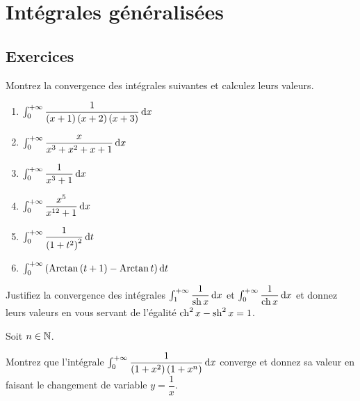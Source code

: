 \chapter{Intégrales généralisées}

\minitoc

\section*{Exercices}

\legendeexercices

\begin{exos}
Montrez la convergence des intégrales suivantes et calculez leurs valeurs.

\begin{enumerate}
    \item \(\int_0^{\pinf}\dfrac{1}{\paren{x+1}\paren{x+2}\paren{x+3}}\odif{x}\) \\
    \item \(\int_0^{\pinf}\dfrac{x}{x^3+x^2+x+1}\odif{x}\) \\
    \item \(\int_0^{\pinf}\dfrac{1}{x^3+1}\odif{x}\) \\
    \item \(\int_0^{\pinf}\dfrac{x^5}{x^{12}+1}\odif{x}\) \\
    \item \(\int_0^{\pinf}\dfrac{1}{\paren{1+t^2}^2}\odif{t}\) \\
    \item \(\int_0^{\pinf}\paren{\Arctan\paren{t+1}-\Arctan t}\odif{t}\)
\end{enumerate}
\end{exos}

\begin{exos}
Justifiez la convergence des intégrales \(\int_1^{\pinf}\dfrac{1}{\sh x}\odif{x}\) et \(\int_0^{\pinf}\dfrac{1}{\ch x}\odif{x}\) et donnez leurs valeurs en vous servant de l'égalité \(\operatorname{ch}^2x-\operatorname{sh}^2x=1\).
\end{exos}

\begin{exos}
Soit \(n\in\mathbb{N}\).

Montrez que l'intégrale \(\int_0^{\pinf}\dfrac{1}{\paren{1+x^2}\paren{1+x^n}}\odif{x}\) converge et donnez sa valeur en faisant le changement de variable \(y=\dfrac{1}{x}\).
\end{exos}

